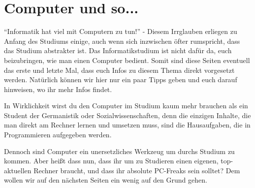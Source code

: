\section{Computer und so...}
"`Informatik hat viel mit Computern zu tun!"' - Diesem Irrglauben erliegen zu
Anfang des Studiums einige, auch wenn sich inzwischen öfter rumspricht, dass
das Studium abstrakter ist. Das Informatikstudium ist nicht dafür da, euch beizubringen, wie man einen
Computer bedient. Somit sind diese Seiten eventuell das erste und letzte Mal, 
dass euch Infos zu diesem Thema direkt vorgesetzt werden. Natürlich können wir
hier nur ein paar Tipps geben und euch darauf hinweisen, wo ihr mehr Infos 
findet.

In Wirklichkeit wirst du den Computer im Studium kaum mehr brauchen als ein
Student der Germanistik oder Sozialwissenschaften, denn die einzigen Inhalte, 
die man direkt am Rechner lernen und umsetzen muss, sind die Hausaufgaben, 
die in Programmieren aufgegeben werden.

Dennoch sind Computer ein unersetzliches Werkzeug um durchs Studium zu kommen.
Aber heißt dass nun, dass ihr um zu Studieren einen eigenen, top-aktuellen Rechner
braucht, und dass ihr absolute PC-Freaks sein solltet? Dem wollen wir auf den 
nächsten Seiten ein wenig auf den Grund gehen.


